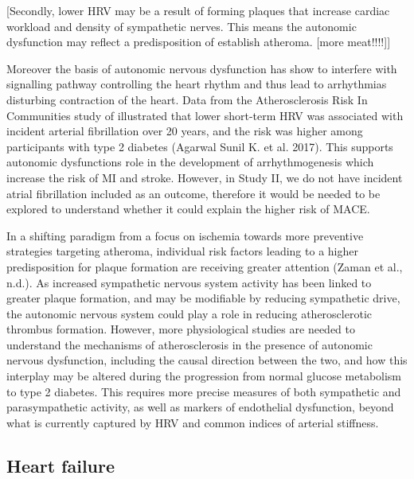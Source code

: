 \documentclass[
  a4paper,
  headsepline=true,
  open=any]{scrbook}
\begin{document}
{[}Secondly, lower HRV may be a result of forming plaques that increase
cardiac workload and density of sympathetic nerves. This means the
autonomic dysfunction may reflect a predisposition of establish
atheroma. {[}more meat!!!!{]}{]}

Moreover the basis of autonomic nervous dysfunction has show to
interfere with signalling pathway controlling the heart rhythm and thus
lead to arrhythmias disturbing contraction of the heart. Data from the
Atherosclerosis Risk In Communities study of illustrated that lower
short-term HRV was associated with incident arterial fibrillation over
20 years, and the risk was higher among participants with type 2
diabetes (Agarwal Sunil K. et al. 2017). This supports autonomic
dysfunctions role in the development of arrhythmogenesis which increase
the risk of MI and stroke. However, in Study II, we do not have incident
atrial fibrillation included as an outcome, therefore it would be needed
to be explored to understand whether it could explain the higher risk of
MACE.

In a shifting paradigm from a focus on ischemia towards more preventive
strategies targeting atheroma, individual risk factors leading to a
higher predisposition for plaque formation are receiving greater
attention (Zaman et al., n.d.). As increased sympathetic nervous system
activity has been linked to greater plaque formation, and may be
modifiable by reducing sympathetic drive, the autonomic nervous system
could play a role in reducing atherosclerotic thrombus formation.
However, more physiological studies are needed to understand the
mechanisms of atherosclerosis in the presence of autonomic nervous
dysfunction, including the causal direction between the two, and how
this interplay may be altered during the progression from normal glucose
metabolism to type 2 diabetes. This requires more precise measures of
both sympathetic and parasympathetic activity, as well as markers of
endothelial dysfunction, beyond what is currently captured by HRV and
common indices of arterial stiffness.

\hypertarget{heart-failure-1}{%
\subsection{Heart failure}\label{heart-failure-1}}
\end{document}
